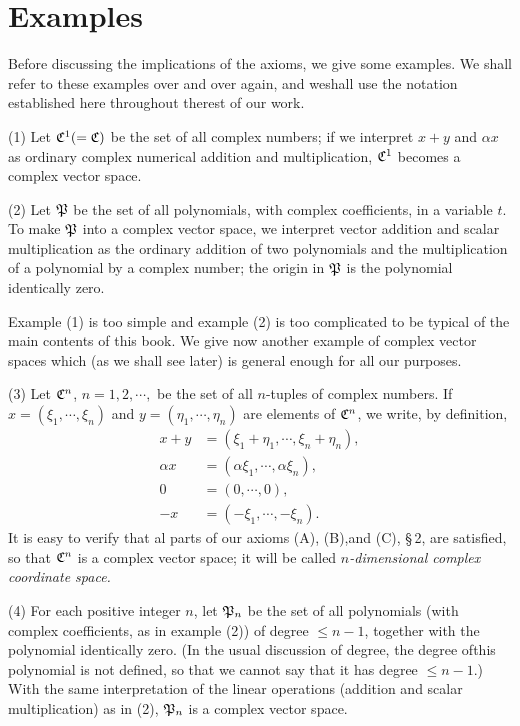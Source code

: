 \section{Examples}

Before discussing the implications of the axioms, we give some examples. We
shall refer to these examples over and over again, and weshall use the notation
established here throughout therest of our work.

(1) Let \(\frak{C}^1 (= \frak{C})\) be the set of all complex numbers; if we
interpret \(x + y\) and \(\alpha x\) as ordinary complex numerical addition and
multiplication, \(\frak{C}^1\) becomes a complex vector space.

(2) Let \(\frak{P}\) be the set of all polynomials, with complex coefficients,
in a variable \(t\). To make \(\frak{P}\) into a complex vector space, we
interpret vector addition and scalar multiplication as the ordinary addition of
two polynomials and the multiplication of a polynomial by a complex number; the
origin in \(\frak{P}\) is the polynomial identically zero.

Example (1) is too simple and example (2) is too complicated to be typical of
the main contents of this book. We give now another example of complex vector
spaces which (as we shall see later) is general enough for all our purposes. 

(3) Let \(\frak{C}^n\), \(n = 1, 2, \cdots,\) be the set of all \(n\)-tuples of
complex numbers. If \(x = (\xi_1,\cdots, \xi_n)\) and \(y = (\eta_1, \cdots,
\eta_n)\) are elements of \(\frak{C}^n\), we write, by definition,
\begin{align*}
    x + y &= (\xi_1 + \eta_1, \cdots, \xi_n + \eta_n),\\
    \alpha x &= (\alpha \xi_1, \cdots, \alpha \xi_n),\\
    0 &= (0, \cdots, 0),\\
    -x &= (-\xi_1, \cdots, -\xi_n).
\end{align*}
It is easy to verify that al parts of our axioms (A), (B),and (C), \S\,2, are
satisfied, so that \(\frak{C}^n\) is a complex vector space; it will be called
\(n\)\emph{-dimensional complex coordinate space.}

(4) For each positive integer \(n\), let \(\frak{P}_n\) be the set of all polynomials (with complex coefficients, as in example (2)) of degree \(\leq n-1\), together with the polynomial identically zero. (In the usual discussion of degree, the degree ofthis polynomial is not defined, so that we cannot say that it has degree \(\leq n-1\).) With the same interpretation of the linear operations (addition and scalar multiplication) as in (2), \(\frak{P}_n\) is a complex vector space.

